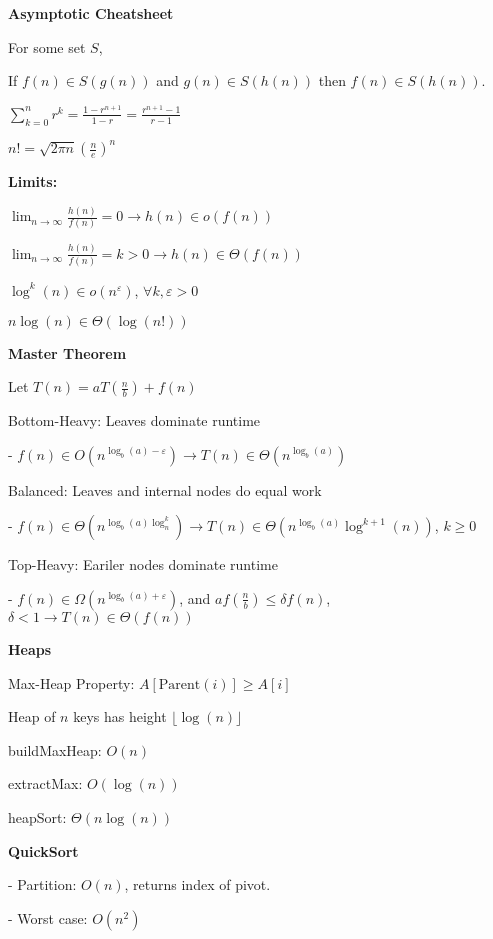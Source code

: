 \documentclass[8pt, letterpaper]{extarticle}
\begin{document}
\vline
\hspace{1pt}
\begin{minipage}[t]{0.45\textwidth}

\textbf{Asymptotic Cheatsheet}

For some set $S$,

If $f(n) \in S(g(n))$ and $g(n) \in S(h(n))$ then $f(n) \in S(h(n))$.

$\sum_{k=0}^{n} r^k = \frac{1 - r^{n+1}}{1 - r} = \frac{r^{n+1} - 1}{r - 1}$

$n! = \sqrt{2\pi n}(\frac{n}{e})^n$

{\small \textbf{Limits: }}

$\lim_{n \to \infty} \frac{h(n)}{f(n)} = 0 \rightarrow h(n) \in o(f(n))$

$\lim_{n \to \infty} \frac{h(n)}{f(n)} = k > 0 \rightarrow h(n) \in \Theta(f(n))$

$\log^k(n) \in o(n^{\varepsilon})$, $\forall k, \varepsilon > 0$

$n\log(n) \in \Theta(\log(n!))$

\textbf{Master Theorem}

Let $T(n) = aT(\frac{n}{b}) + f(n)$

Bottom-Heavy: Leaves dominate runtime

- $f(n) \in O(n^{\log_b(a) - \varepsilon}) \rightarrow T(n) \in \Theta(n^{\log_b(a)})$

Balanced: Leaves and internal nodes do equal work

- $f(n) \in \Theta(n^{\log_b(a) \log^k_n}) \rightarrow T(n) \in \Theta(n^{\log_b(a)}\log^{k+1}(n))$, $k \geq 0$

Top-Heavy: Eariler nodes dominate runtime

- $f(n) \in \Omega(n^{\log_b(a) + \varepsilon})$, and $af(\frac{n}{b}) \leq \delta f(n)$, $\delta < 1 \rightarrow T(n) \in \Theta(f(n))$

\textbf{Heaps}

Max-Heap Property: $A[\text{Parent}(i)] \geq A[i]$

Heap of $n$ keys has height $\lfloor \log(n) \rfloor$

buildMaxHeap: $O(n)$

extractMax: $O(\log(n))$

heapSort: $\Theta(n\log(n))$

\textbf{QuickSort}

- Partition: $O(n)$, returns index of pivot.

- Worst case: $O(n^2)$


\end{minipage}
\end{document}
